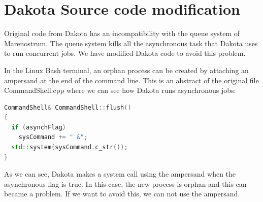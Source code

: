 \documentclass[12pt,a4paper,article]{memoir}
\begin{document}
%
%
%
%
%
%
%
%


\chapter{Dakota Source code modification}
\label{chapter:CodeMod}

Original code from Dakota has an incompatibility with the queue system of Marenostrum. The queue system kills all the asynchronous task that Dakota uses to run concurrent jobs. We have modified Dakota code to avoid this problem.

In the Linux Bash terminal, an orphan process can be created by attaching an ampersand at the end of the command line. This is an abstract of the original file CommandShell.cpp where we can see how Dakota runs asynchronous jobs:

\begin{lstlisting}[style=MyCodeStyle,language=C++]
CommandShell& CommandShell::flush()
{
  if (asynchFlag)
    sysCommand += " &";
  std::system(sysCommand.c_str());
}
\end{lstlisting}

As we can see, Dakota makes a system call using the ampersand when the asynchronous flag is true. In this case, the new process is orphan and this can became a problem. If we want to avoid this, we can not use the ampersand.
\end{document}
